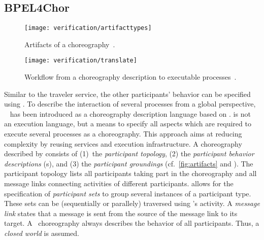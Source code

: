 \subsection*{BPEL{\footnotesize 4}Chor}

\begin{figure}[tb]
\centering
\texttt{[image: verification/artifacttypes]}
\caption{Artifacts of a \bpelchor{} choreography~\cite{DeckerKLW_2007_icws,DeckerKLW_2009_dke}.}\label{fig:artifacts}
\end{figure}

\begin{figure}[tb]
\centering
\texttt{[image: verification/translate]}
\caption{Workflow from a \bpelchor{} choreography description to executable  processes~\cite{DeckerKLW_2009_dke}.}\label{fig:bpelchortrans}
\end{figure}

Similar to the traveler service, the other participants' behavior can be specified using . To describe the interaction of several  processes from a global perspective, \bpelchor{}~\cite{DeckerKLW_2007_icws} has been introduced as a choreography description language based on . \bpelchor{} is not an execution language, but a means to specify all aspects which are required to execute several  processes as a choreography. This approach aims at reducing complexity by reusing services and execution infrastructure. A choreography described by \bpelchor{} consists of (1)~the \emph{participant topology}, (2) the \emph{participant behavior descriptions} (s), and (3) the \emph{participant groundings} (cf.\ \autoref{fig:artifacts} and \cite{DeckerKLW_2007_icws,DeckerKLW_2009_dke}). The participant topology lists all participants taking part in the choreography and all message links connecting activities of different participants. \bpelchor{} allows for the specification of \emph{participant sets} to group several instances of a participant type. These sets can be (sequentially or parallely) traversed using 's  activity. A \emph{message link} states that a message is sent from the source of the message link to its target. A \bpelchor\ choreography always describes the behavior of all participants. Thus, a \emph{closed world} is assumed.

